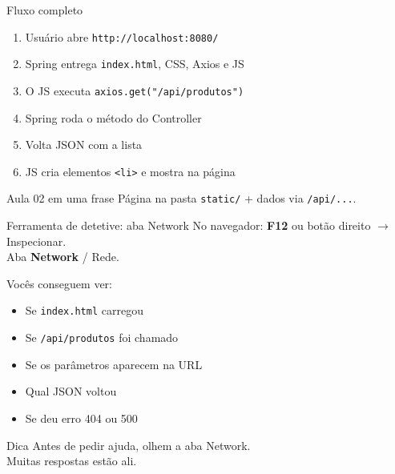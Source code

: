 \documentclass[aspectratio=169,11pt]{beamer}
\begin{document}
\begin{frame}{Fluxo completo}
  \begin{enumerate}
    \item Usuário abre \texttt{http://localhost:8080/}
    \item Spring entrega \texttt{index.html}, CSS, Axios e JS
    \item O JS executa \texttt{axios.get("/api/produtos")}
    \item Spring roda o método do Controller
    \item Volta JSON com a lista
    \item JS cria elementos \texttt{<li>} e mostra na página
  \end{enumerate}

  \vspace{0.7em}
  \begin{alertblock}{Aula 02 em uma frase}
    Página na pasta \texttt{static/} + dados via \texttt{/api/...}.
  \end{alertblock}
\end{frame}

\begin{frame}{Ferramenta de detetive: aba Network}
  No navegador: \textbf{F12} ou botão direito $\rightarrow$ Inspecionar.\\
  Aba \textbf{Network} / Rede.

  \vspace{0.5em}
  Vocês conseguem ver:
  \begin{itemize}
    \item Se \texttt{index.html} carregou
    \item Se \texttt{/api/produtos} foi chamado
    \item Se os parâmetros aparecem na URL
    \item Qual JSON voltou
    \item Se deu erro 404 ou 500
  \end{itemize}

  \vspace{0.6em}
  \begin{block}{Dica}
    Antes de pedir ajuda, olhem a aba Network.\\
    Muitas respostas estão ali.
  \end{block}
\end{frame}
\end{document}
